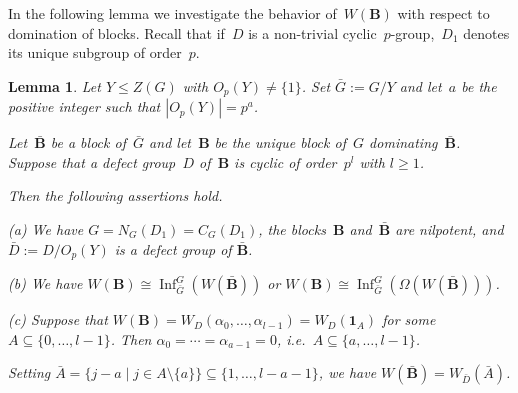 \documentclass[12pt]{amsart}
\newcommand{\bB}{{\mathbf{B}}}
\DeclareMathOperator{\Inf}{Inf}                    %
\newtheorem{lem}[thm]{Lemma}
\theoremstyle{theorem}
\theoremstyle{definition}
\theoremstyle{remark}
\begin{document}
In the following lemma we investigate the behavior of~$W( \bB )$ with respect to 
domination of blocks. Recall that if~$D$ is a non-trivial 
cyclic~$p$-group,~$D_1$ denotes its unique subgroup of order~$p$.

\begin{lem}
\label{lem:OpZG}
Let $Y \leq Z(G)$ with $O_p(Y) \neq \{ 1 \}$. Set $\bar{G} := G/Y$ and let~$a$ be
the positive integer such that $|O_{p}(Y)| = p^{a}$. 

Let~$\bar{\bB}$ be a block of~$\bar{G}$ and let~$\bB$ be the unique block of~$G$ 
dominating~$\bar{\bB}$. Suppose that a defect group~$D$ of~$\bB$ is cyclic of
order~$p^l$ with $l \geq 1$. 

Then the following assertions hold.

{\rm (a)} We have $G = N_{G}(D_{1}) = C_{G}(D_{1})$, the blocks~$\bB$
and~$\bar{\bB}$ are nilpotent, and $\bar{D} := D/O_{p}(Y)$  is a defect
group of $\bar{\bB}$.

{\rm(b)} We have $W(\bB) \cong \Inf_{\bar{G}}^{G}(W(\bar{\bB}))$ or
$W(\bB) \cong \Inf_{\bar{G}}^{G}(\Omega(W(\bar{\bB})))$.

{\rm (c)} Suppose that $W(\bB) = W_D(\alpha_0,\ldots,\alpha_{l-1}) = 
W_{D}( {\mathbf{1}}_{A})$ for some $A \subseteq \{ 0, \ldots , l - 1 \}$. 
Then
$\alpha_{0} = \cdots = \alpha_{a-1} = 0$, i.e.\ $A \subseteq \{a, \ldots, l-1\}$.
 
Setting $\bar{A} = \{ j - a \mid j \in A \setminus \{ a \} \} \subseteq 
\{ 1, \ldots , l - a - 1 \}$, we have 
$W( \bar{\bB} ) = W_{\bar{D}}( \bar{A} )$.
\end{lem}
\end{document}
